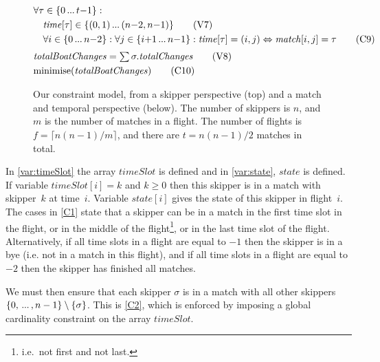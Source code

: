 \documentclass{llncs}
\newcommand{\match}{\mathit{match}}
\newcommand{\timeSlot}{\mathit{timeSlot}}
\newcommand{\state}{\mathit{state}}
\newcommand{\totalChanges}{\mathit{totalChanges}}
\newcommand{\totalBoatChanges}{\mathit{totalBoatChanges}}
\newcommand{\timeVar}{\mathit{time}}
\newcommand{\minimise}{\mathrm{minimise}}
\newcommand\nldots{\,\hbox to 0.8em{.\hss.\hss.}\,}
\begin{document}
\begin{figure}[p]
\begin{framed}
\begin{align}
    & \forall \tau \in \{0 \nldots t{-}1 \} : \nonumber \\
    & \hspace*{1em} \timeVar[{\tau}] \in \{(0,1) \nldots (n{-}2,n{-}1)\} \tag{V7} \label{V7} \\
    & \hspace*{1em} \forall i \in \{0 \nldots n{-}2\} : \forall  j \in \{ i{+}1 \nldots n{-}1 \} : \timeVar[{\tau}] = (i,j) \Leftrightarrow \match[{i,j}] = \tau \tag{C9} \label{C9} \\[0.1cm]
    & \totalBoatChanges = \textstyle\sum \sigma.\totalChanges \label{V8} \tag{V8} \\
    & \minimise(\totalBoatChanges) \label{C10} \tag{C10}
\end{align}
\end{framed}
\caption{Our constraint model, from a skipper perspective (top) and a match and temporal perspective
(below). The number of skippers is $n$, and $m$ is the number of matches in a flight. The number of
flights is $f = \lceil n(n-1)/m \rceil$, and there are $t = n(n-1)/2$ matches in
total.}\label{model:stage1}
\end{figure}

In \eqref{var:timeSlot} the array $\timeSlot$ is defined and in \eqref{var:state}, $\state$ is
defined. If variable $\timeSlot[{i}] = k$ and $k \geq 0$ then this skipper is in a match with
skipper~$k$ at time~$i$. Variable $\state[{i}]$ gives the state of this skipper in flight~$i$. The
cases in \eqref{C1} state that a skipper can be in a match in the first time slot in the flight, or in
the middle of the flight\footnote{i.e.\ not first and not last.}, or in the last time
slot of the flight. Alternatively, if all time slots in a flight are equal to $-1$ then the skipper
is in a bye (i.e. not in a match in this flight), and if all time slots in a flight are equal to $-2$ then the skipper has finished all matches.

We must then ensure that each skipper $\sigma$ is in a match with all other skippers $\{0, \nldots,
n-1\} \setminus \{\sigma\}$. This is \eqref{C2}, which is enforced by imposing a global
cardinality constraint \cite{globCard} on the array $\timeSlot$.
\end{document}
